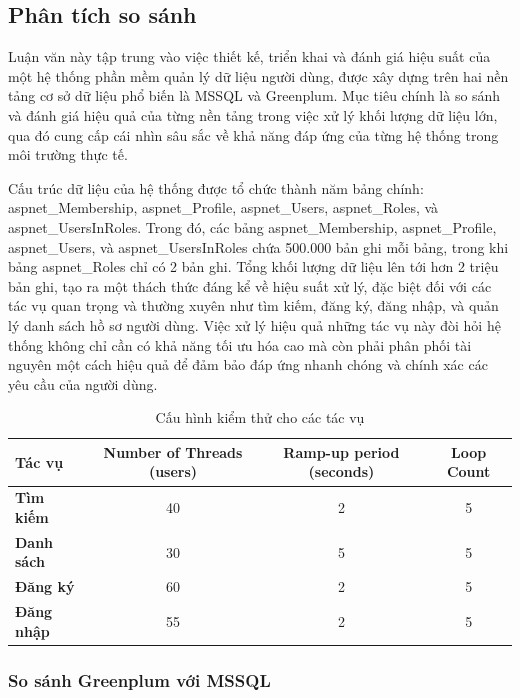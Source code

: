 \documentclass{article}[14pt]
\begin{document}
\subsection{Phân tích so sánh}

Luận văn này tập trung vào việc thiết kế, triển khai và đánh giá hiệu suất của một hệ thống phần mềm quản lý dữ liệu người dùng, được xây dựng trên hai nền tảng cơ sở dữ liệu phổ biến là MSSQL và Greenplum. Mục tiêu chính là so sánh và đánh giá hiệu quả của từng nền tảng trong việc xử lý khối lượng dữ liệu lớn, qua đó cung cấp cái nhìn sâu sắc về khả năng đáp ứng của từng hệ thống trong môi trường thực tế.

Cấu trúc dữ liệu của hệ thống được tổ chức thành năm bảng chính: aspnet\_Membership, aspnet\_Profile, aspnet\_Users, aspnet\_Roles, và aspnet\_UsersInRoles. Trong đó, các bảng aspnet\_Membership, aspnet\_Profile, aspnet\_Users, và aspnet\_UsersInRoles chứa 500.000 bản ghi mỗi bảng, trong khi bảng aspnet\_Roles chỉ có 2 bản ghi. Tổng khối lượng dữ liệu lên tới hơn 2 triệu bản ghi, tạo ra một thách thức đáng kể về hiệu suất xử lý, đặc biệt đối với các tác vụ quan trọng và thường xuyên như tìm kiếm, đăng ký, đăng nhập, và quản lý danh sách hồ sơ người dùng. Việc xử lý hiệu quả những tác vụ này đòi hỏi hệ thống không chỉ cần có khả năng tối ưu hóa cao mà còn phải phân phối tài nguyên một cách hiệu quả để đảm bảo đáp ứng nhanh chóng và chính xác các yêu cầu của người dùng.

\begin{table}[htbp]
\centering
\renewcommand{\arraystretch}{1.3} %
\begin{tabular}{|l|c|c|c|}
\hline
\textbf{Tác vụ} & \textbf{Number of Threads (users)} & \textbf{Ramp-up period (seconds)} & \textbf{Loop Count} \\ \hline
\textbf{Tìm kiếm} & 40 & 2 & 5 \\ \hline
\textbf{Danh sách} & 30 & 5 & 5 \\ \hline
\textbf{Đăng ký} & 60 & 2 & 5 \\ \hline
\textbf{Đăng nhập} & 55 & 2 & 5 \\ \hline
\end{tabular}
\caption{Cấu hình kiểm thử cho các tác vụ}
\label{tab:task_configuration}
\end{table}


\subsubsection{So sánh Greenplum với MSSQL}
\end{document}
